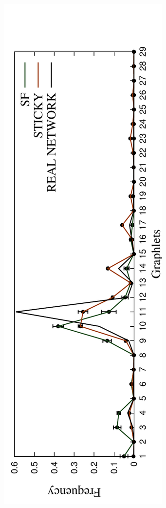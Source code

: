 \begin{figure}[H]
\begin{subfigure}[b]{1.0\textwidth}
  \end{subfigure}
  \begin{subfigure}[b]{1.0\textwidth}
    \includegraphics[angle=-90,scale=0.6]{../code/final_results/hsa_metabolic_network/avg_egdvs_rnd_spreads_figures/spreads_34_rnd2.pdf} 

\end{subfigure}
\end{figure}
